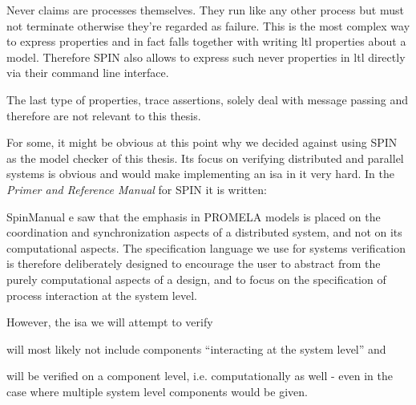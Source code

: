 Never claims are processes themselves.
They run like any other process but must not terminate otherwise they're regarded as failure.
This is the most complex way to express properties and in fact falls together with writing \gls{ltl} properties about a model.
Therefore SPIN also allows to express such never properties in \gls{ltl} directly via their command line interface.

The last type of properties, trace assertions, solely deal with message passing and therefore are not relevant to this thesis.

For some, it might be obvious at this point why we decided against using SPIN as the model checker of this thesis.
Its focus on verifying distributed and parallel systems is obvious and would make implementing an \gls{isa} in it very hard.
In the \textit{Primer and Reference Manual} for SPIN it is written:
\begin{displaycquote}[p.33]{SpinManual}
    e saw that the emphasis in PROMELA models is placed on the coordination and synchronization aspects of a distributed system, and not on its computational aspects. \textelp{}
    The specification language we use for systems verification is therefore deliberately designed to encourage the user to abstract from the purely computational aspects of a design, and to focus on the specification of process interaction at the system level.
\end{displaycquote}

However, the \gls{isa} we will attempt to verify
\begin{enumerate*}[label=\alph*)]
    \item will most likely not include components \enquote{interacting at the system level} and
    \item will be verified on a component level, i.e. computationally as well - even in the case where multiple system level components would be given.
\end{enumerate*}


